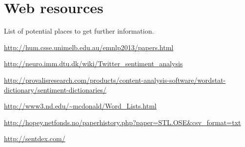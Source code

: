 \chapter{Web resources}
List of potential places to get further information.

\url{http://hum.csse.unimelb.edu.au/emnlp2013/papers.html}

\url{http://neuro.imm.dtu.dk/wiki/Twitter_sentiment_analysis}

\url{http://provalisresearch.com/products/content-analysis-software/wordstat-dictionary/sentiment-dictionaries/}

\url{http://www3.nd.edu/~mcdonald/Word_Lists.html}

\url{http://hopey.netfonds.no/paperhistory.php?paper=STL.OSE&csv_format=txt}

\url{http://sentdex.com/}


